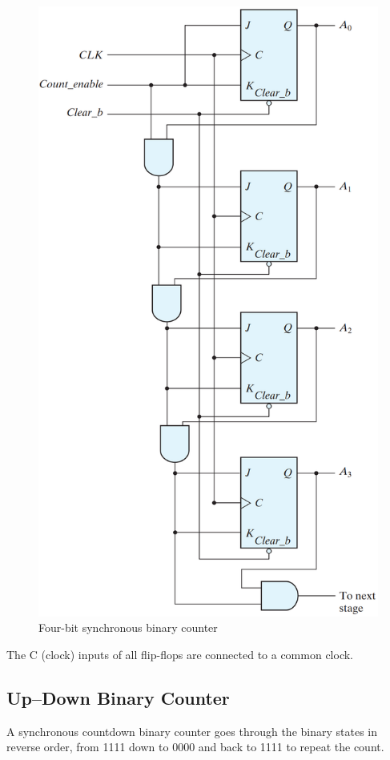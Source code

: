 \begin{figure}[H]
  \centering
  \includegraphics[width=.8\linewidth]{img/fig-6.12.png}
  \caption{Four-bit synchronous binary counter}
  \label{fig:6.12}
\end{figure}

The C (clock) inputs of all flip-flops are connected to a common clock.

\columnbreak

\subsection{Up–Down Binary Counter}
\label{subsec:up-down-binary-counter}

A synchronous countdown binary counter goes through the binary states in reverse order, from 1111 down to 0000 and back to 1111 to repeat the count.

